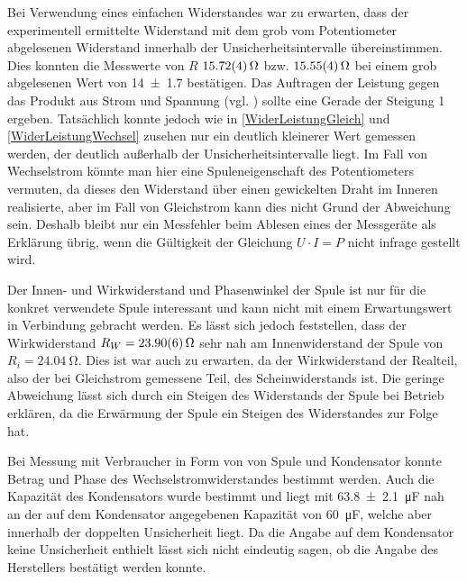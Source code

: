 \documentclass[
	a4paper,
	12pt,
	pagesize,
	ngerman
]{scrartcl}
\begin{document}
	Bei Verwendung eines einfachen Widerstandes war zu erwarten, dass der experimentell ermittelte Widerstand mit dem grob vom Potentiometer abgelesenen Widerstand innerhalb der Unsicherheitsintervalle übereinstimmen. Dies konnten die Messwerte von $R$ $\SI{15,72 \pm 0,04}{\Omega}$ bzw. $\SI{15,55 \pm 0,04}{\Omega}$ bei einem grob abgelesenen Wert von \SI{14 \pm 1,7}{\Omega} bestätigen.
	Das Auftragen der Leistung gegen das Produkt aus Strom und Spannung (vgl. ) sollte eine Gerade der Steigung 1 ergeben.
	Tatsächlich konnte jedoch wie in \cref{WiderLeistungGleich} und \cref{WiderLeistungWechsel} zusehen nur ein deutlich kleinerer Wert gemessen werden, der deutlich außerhalb der Unsicherheitsintervalle liegt.
	Im Fall von Wechselstrom könnte man hier eine Spuleneigenschaft des Potentiometers vermuten, da dieses den Widerstand über einen gewickelten Draht im Inneren realisierte, aber im Fall von Gleichstrom kann dies nicht Grund der Abweichung sein.
	Deshalb bleibt nur ein Messfehler beim Ablesen eines der Messgeräte als Erklärung übrig, wenn die Gültigkeit der Gleichung $ U \cdot I = P $ nicht infrage gestellt wird.
	\par
	Der Innen- und Wirkwiderstand und Phasenwinkel der Spule ist nur für die konkret verwendete Spule interessant und kann nicht mit einem Erwartungswert in Verbindung gebracht werden.
	Es lässt sich jedoch feststellen, dass der Wirkwiderstand $ R_W = \SI{23,9 \pm 0,06}{\ohm}$ sehr nah am Innenwiderstand der Spule von $ R_i = \SI{24,04}{\ohm} $.
	Dies ist war auch zu erwarten, da der Wirkwiderstand der Realteil, also der bei Gleichstrom gemessene Teil, des Scheinwiderstands ist.
	Die geringe Abweichung lässt sich durch ein Steigen des Widerstands der Spule bei Betrieb erklären, da die Erwärmung der Spule ein Steigen des Widerstandes zur Folge hat.
	\par 
	Bei Messung mit Verbraucher in Form von von Spule und Kondensator konnte Betrag und Phase des Wechselstromwiderstandes bestimmt werden.
	Auch die Kapazität des Kondensators wurde bestimmt und liegt mit \SI{63,8 \pm 2,1}{\micro \farad} nah an der auf dem Kondensator angegebenen Kapazität von \SI{60}{\micro \farad}, welche aber innerhalb der doppelten Unsicherheit liegt.
	Da die Angabe auf dem Kondensator keine Unsicherheit enthielt lässt sich nicht eindeutig sagen, ob die Angabe des Herstellers bestätigt werden konnte.
	
\end{document}
